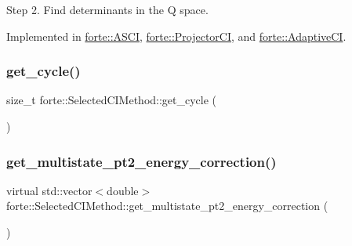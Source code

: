 Step 2. Find determinants in the Q space. 



Implemented in \mbox{\hyperlink{classforte_1_1_a_s_c_i_a197192d707eee6c0c6046d3dfdf78162}{forte\+::\+A\+S\+CI}}, \mbox{\hyperlink{classforte_1_1_projector_c_i_a8818efb18539867d404b98e13b0a7390}{forte\+::\+Projector\+CI}}, and \mbox{\hyperlink{classforte_1_1_adaptive_c_i_a84c2bbf2fd0dbcfe3732c0fb6a383bd8}{forte\+::\+Adaptive\+CI}}.

\mbox{\label{classforte_1_1_selected_c_i_method_a50f16f61344cf98ed8c2351209725702}} 
\subsubsection{\texorpdfstring{get\+\_\+cycle()}{get\_cycle()}}
{\footnotesize\ttfamily size\+\_\+t forte\+::\+Selected\+C\+I\+Method\+::get\+\_\+cycle (\begin{DoxyParamCaption}{ }\end{DoxyParamCaption})\hspace{0.3cm}{\ttfamily [virtual]}}

\mbox{\label{classforte_1_1_selected_c_i_method_abbe18ea3e5f1a77df13a38764aeef62c}} 
\subsubsection{\texorpdfstring{get\+\_\+multistate\+\_\+pt2\+\_\+energy\+\_\+correction()}{get\_multistate\_pt2\_energy\_correction()}}
{\footnotesize\ttfamily virtual std\+::vector$<$double$>$ forte\+::\+Selected\+C\+I\+Method\+::get\+\_\+multistate\+\_\+pt2\+\_\+energy\+\_\+correction (\begin{DoxyParamCaption}{ }\end{DoxyParamCaption})\hspace{0.3cm}{\ttfamily [pure virtual]}}



